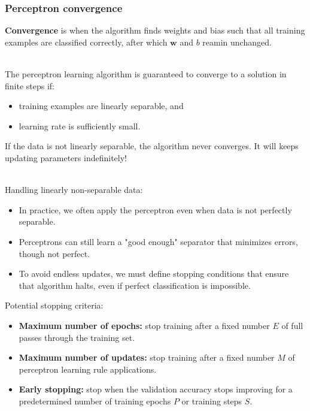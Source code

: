\documentclass[11pt]{article}
\begin{document}
\subsubsection{Perceptron convergence}
\begin{definition}[Convergence]
\textbf{Convergence} is when the algorithm finds weights and bias such that all training examples are classified correctly, after which $\mathbf{w}$ and $b$ reamin unchanged.
\end{definition}
$\quad$\\[-1em]
The perceptron learning algorithm is guaranteed to converge to a solution in finite steps if:
\begin{itemize}
    \item training examples are linearly separable, and
    \item learning rate is sufficiently small.
\end{itemize}
\begin{warning}[Important]
If the data is not linearly separable, the algorithm never converges. It will keeps updating parameters indefinitely!
\end{warning}
$\quad$\\[-1em]
Handling linearly non-separable data:
\begin{itemize}
    \item In practice, we often apply the perceptron even when data is not perfectly separable.
    \item Perceptrons can still learn a "good enough" separator that minimizes errors, though not perfect.
    \item To avoid endless updates, we must define stopping conditions that ensure that algorithm halts, even if perfect classification is impossible.
\end{itemize}
Potential stopping criteria:
\begin{itemize}
    \item \textbf{Maximum number of epochs:} stop training after a fixed number $E$ of full passes through the training set.
    \item \textbf{Maximum number of updates:} stop training after a fixed number $M$ of perceptron learning rule applications.
    \item \textbf{Early stopping:} stop when the validation accuracy stops improving for a predetermined number of training epochs $P$ or training steps $S$.
\end{itemize}
\end{document}
